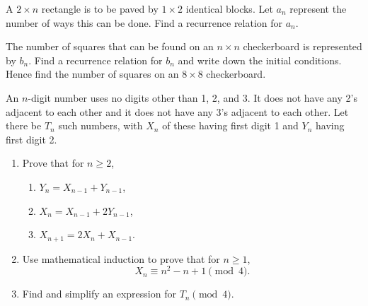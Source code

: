 \begin{problem}
    A $2 \times n$ rectangle is to be paved by $1 \times 2$ identical blocks. Let $a_n$ represent the number of ways this can be done. Find a recurrence relation for $a_n$.
\end{problem}

\begin{problem}
    The number of squares that can be found on an $n \times n$ checkerboard is represented by $b_n$. Find a recurrence relation for $b_n$ and write down the initial conditions. Hence find the number of squares on an $8 \times 8$ checkerboard.
\end{problem}

\begin{problem}
    An $n$-digit number uses no digits other than 1, 2, and 3. It does not have any 2's adjacent to each other and it does not have any 3's adjacent to each other. Let there be $T_n$ such numbers, with $X_n$ of these having first digit 1 and $Y_n$ having first digit 2.

    \begin{enumerate}
        \item Prove that for $n \geq 2$,
        \begin{enumerate}
            \item $Y_n = X_{n-1} + Y_{n-1}$,
            \item $X_n = X_{n-1} + 2Y_{n-1}$,
            \item $X_{n+1} = 2X_n + X_{n-1}$.
        \end{enumerate}
        \item Use mathematical induction to prove that for $n \geq 1$, \[X_n \equiv n^2 - n + 1 \pmod{4}.\]
        \item Find and simplify an expression for $T_n \pmod{4}$.
    \end{enumerate}
\end{problem}